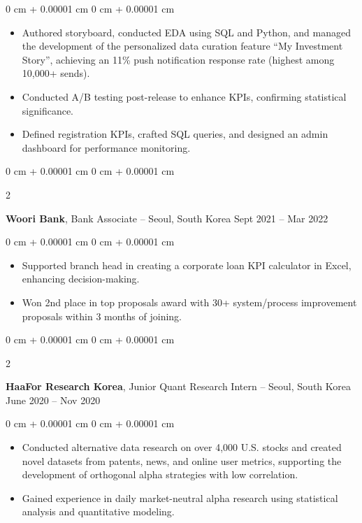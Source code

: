 \documentclass[10pt, letterpaper]{article}
\newenvironment{highlights}{
    \begin{itemize}[
        topsep=0.10 cm,
        parsep=0.10 cm,
        partopsep=0pt,
        itemsep=0pt,
        leftmargin=0 cm + 10pt
    ]
}{
    \end{itemize}
} %
\newenvironment{onecolentry}{
    \begin{adjustwidth}{
        0 cm + 0.00001 cm
    }{
        0 cm + 0.00001 cm
    }
}{
    \end{adjustwidth}
} %
\newenvironment{twocolentry}[2][]{
    \onecolentry
    \def\secondColumn{#2}
    \setcolumnwidth{\fill, 4.5 cm}
    \begin{paracol}{2}
}{
    \switchcolumn \raggedleft \secondColumn
    \end{paracol}
    \endonecolentry
} %
\begin{document}
        \vspace{0.10 cm}
        \begin{onecolentry}
            \begin{highlights}
                \item Authored storyboard, conducted EDA using SQL and Python, and managed the development of the personalized data curation feature “My Investment Story”, achieving an 11\% push notification response rate (highest among 10,000+ sends).
                \item Conducted A/B testing post-release to enhance KPIs, confirming statistical significance.
                \item Defined registration KPIs, crafted SQL queries, and designed an admin dashboard for performance monitoring.
            \end{highlights}
        \end{onecolentry}


        \vspace{0.2 cm}

        \begin{twocolentry}{
            Sept 2021 – Mar 2022
        }
            \textbf{Woori Bank}, Bank Associate -- Seoul, South Korea\end{twocolentry}

        \vspace{0.10 cm}
        \begin{onecolentry}
            \begin{highlights}
                \item Supported branch head in creating a corporate loan KPI calculator in Excel, enhancing decision-making.
                \item Won 2nd place in top proposals award with 30+ system/process improvement proposals within 3 months of joining.
            \end{highlights}
        \end{onecolentry}


        \vspace{0.2 cm}

        \begin{twocolentry}{
            June 2020 – Nov 2020
        }
            \textbf{HaaFor Research Korea}, Junior Quant Research Intern -- Seoul, South Korea\end{twocolentry}

        \vspace{0.10 cm}
        \begin{onecolentry}
            \begin{highlights}
                \item Conducted alternative data research on over 4,000 U.S. stocks and created novel datasets from patents, news, and online user metrics, supporting the development of orthogonal alpha strategies with low correlation.
                \item Gained experience in daily market-neutral alpha research using statistical analysis and quantitative modeling.
            \end{highlights}
        \end{onecolentry}
\end{document}

